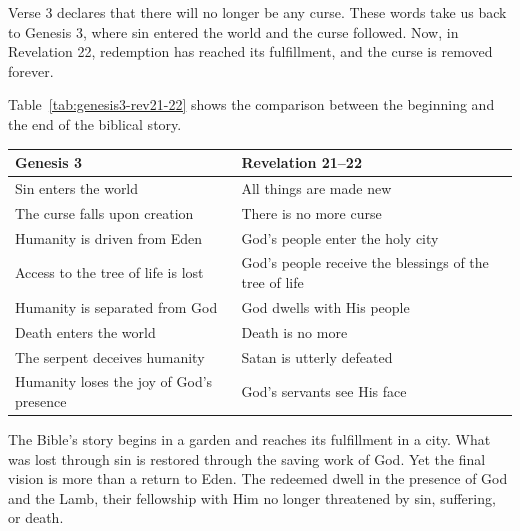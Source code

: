 \begin{InDepth}

Verse 3 declares that there will no longer be any curse. These words take us back to Genesis 3, where sin entered the world and the curse followed. Now, in Revelation 22, redemption has reached its fulfillment, and the curse is removed forever.

Table~\ref{tab:genesis3-rev21-22} shows the comparison between the beginning and the end of the biblical story.

\par\medskip\noindent
\begin{minipage}{\linewidth}
\centering\small
\renewcommand{\arraystretch}{1}\setlength{\tabcolsep}{4pt}
\label{tab:genesis3-rev21-22}
\begin{tabularx}{\linewidth}{>{\raggedright\arraybackslash}X
                              >{\raggedright\arraybackslash}X}
\hline
\textbf{Genesis 3} & \textbf{Revelation 21--22} \\
\hline
Sin enters the world & All things are made new \\
The curse falls upon creation & There is no more curse \\
Humanity is driven from Eden & God's people enter the holy city \\
Access to the tree of life is lost & God's people receive the blessings of the tree of life \\
Humanity is separated from God & God dwells with His people \\
Death enters the world & Death is no more \\
The serpent deceives humanity & Satan is utterly defeated \\
Humanity loses the joy of God's presence & God's servants see His face \\
\hline
\end{tabularx}
\end{minipage}
\end{InDepth}

The Bible's story begins in a garden and reaches its fulfillment in a city. What was lost through sin is restored through the saving work of God. Yet the final vision is more than a return to Eden. The redeemed dwell in the presence of God and the Lamb, their fellowship with Him no longer threatened by sin, suffering, or death.

